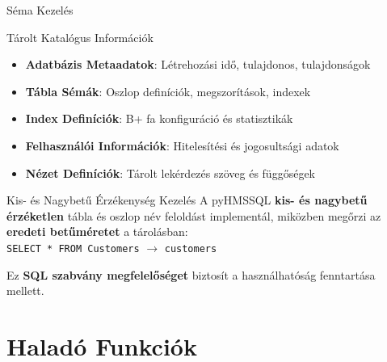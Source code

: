 \documentclass[aspectratio=169]{beamer}
\begin{document}
\begin{frame}{Séma Kezelés}
\begin{block}{Tárolt Katalógus Információk}
\begin{itemize}
    \item \textbf{Adatbázis Metaadatok}: Létrehozási idő, tulajdonos, tulajdonságok
    \item \textbf{Tábla Sémák}: Oszlop definíciók, megszorítások, indexek
    \item \textbf{Index Definíciók}: B+ fa konfiguráció és statisztikák
    \item \textbf{Felhasználói Információk}: Hitelesítési és jogosultsági adatok
    \item \textbf{Nézet Definíciók}: Tárolt lekérdezés szöveg és függőségek
\end{itemize}
\end{block}

\begin{block}{Kis- és Nagybetű Érzékenység Kezelés}
A pyHMSSQL \textbf{kis- és nagybetű érzéketlen} tábla és oszlop név feloldást implementál, miközben megőrzi az \textbf{eredeti betűméretet} a tárolásban:\\

\texttt{SELECT * FROM Customers} $\rightarrow$ \texttt{customers}

Ez \textbf{SQL szabvány megfelelőséget} biztosít a használhatóság fenntartása mellett.
\end{block}
\end{frame}

\section{Haladó Funkciók}
\end{document}
